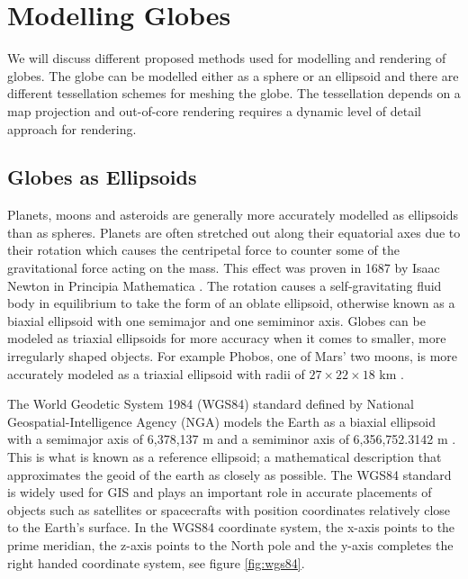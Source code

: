\section{Modelling Globes}

We will discuss different proposed methods used for modelling and rendering of globes. The globe can be modelled either as a sphere or an ellipsoid and there are different tessellation schemes for meshing the globe. The tessellation depends on a map projection and out-of-core rendering requires a dynamic level of detail approach for rendering.

\subsection{Globes as Ellipsoids}

Planets, moons and asteroids are generally more accurately modelled as ellipsoids than as spheres. Planets are often stretched out along their equatorial axes due to their rotation which causes the centripetal force to counter some of the gravitational force acting on the mass. This effect was proven in 1687 by Isaac Newton in Principia Mathematica \cite{newton87}. The rotation causes a self-gravitating fluid body in equilibrium to take the form of an oblate ellipsoid, otherwise known as a biaxial ellipsoid with one semimajor and one semiminor axis. Globes can be modeled as triaxial ellipsoids for more accuracy when it comes to smaller, more irregularly shaped objects. For example Phobos, one of Mars' two moons, is more accurately modeled as a triaxial ellipsoid with radii of $27 \times 22 \times 18$ km \cite{cozzi11}.

The World Geodetic System 1984 (WGS84) standard defined by National Geospatial-Intelligence Agency (NGA) models the Earth as a biaxial ellipsoid with a semimajor axis of 6,378,137 m and a semiminor axis of 6,356,752.3142 m \cite{cozzi11}. This is what is known as a reference ellipsoid; a mathematical description that approximates the geoid of the earth as closely as possible. The WGS84 standard is widely used for GIS and plays an important role in accurate placements of objects such as satellites or spacecrafts with position coordinates relatively close to the Earth's surface. In the WGS84 coordinate system, the x-axis points to the prime meridian, the z-axis points to the North pole and the y-axis completes the right handed coordinate system, see figure \ref{fig:wgs84}.


